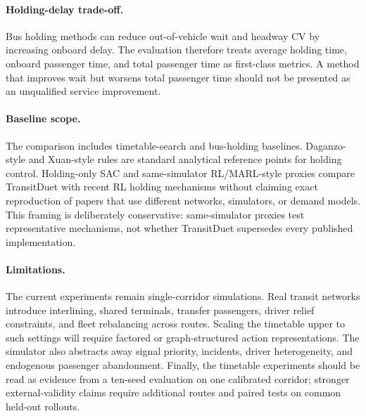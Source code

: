 \paragraph{Holding-delay trade-off.}
Bus holding methods can reduce out-of-vehicle wait and headway CV by increasing onboard delay. The evaluation therefore treats average holding time, onboard passenger time, and total passenger time as first-class metrics. A method that improves wait but worsens total passenger time should not be presented as an unqualified service improvement.

\paragraph{Baseline scope.}
The comparison includes timetable-search and bus-holding baselines. Daganzo-style and Xuan-style rules are standard analytical reference points for holding control. Holding-only SAC and same-simulator RL/MARL-style proxies compare TransitDuet with recent RL holding mechanisms without claiming exact reproduction of papers that use different networks, simulators, or demand models. This framing is deliberately conservative: same-simulator proxies test representative mechanisms, not whether TransitDuet supersedes every published implementation.

\paragraph{Limitations.}
The current experiments remain single-corridor simulations. Real transit networks introduce interlining, shared terminals, transfer passengers, driver relief constraints, and fleet rebalancing across routes. Scaling the timetable upper to such settings will require factored or graph-structured action representations. The simulator also abstracts away signal priority, incidents, driver heterogeneity, and endogenous passenger abandonment. Finally, the timetable experiments should be read as evidence from a ten-seed evaluation on one calibrated corridor; stronger external-validity claims require additional routes and paired tests on common held-out rollouts.
